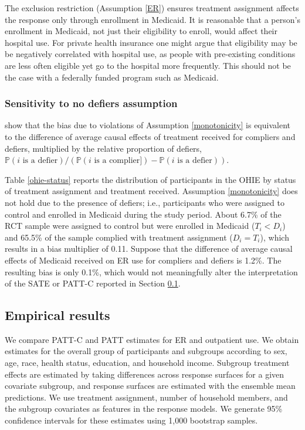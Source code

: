 \documentclass[hidelinks,12pt]{article}
\newcommand{\pr}{\mathbb{P}} %
\begin{document}
{The exclusion restriction (Assumption \ref{ER}) ensures treatment assignment affects the response only through enrollment in Medicaid. It is reasonable that a person's enrollment in Medicaid, not just their eligibility to enroll, would affect their hospital use. For private health insurance one might argue that eligibility may be be negatively correlated with hospital use, as people with pre-existing conditions are less often eligible yet go to the hospital more frequently. This should not be the case with a federally funded program such as Medicaid. 

{\color{red}
\subsubsection{Sensitivity to no defiers assumption} \label{sens-defiers}
}

\citet{Angrist1996} show that the bias due to violations of Assumption \ref{monotonicity} is equivalent to the difference of average causal effects of treatment received for compliers and defiers, multiplied by the relative proportion of defiers, 
$\pr(i\text{ is a defier}) / (\pr(i\text{ is a complier]}) - \pr(i\text{ is a defier})).$

Table \ref{ohie-status} reports the distribution of participants in the OHIE by status of treatment assignment and treatment received. Assumption \ref{monotonicity} does not hold due to the presence of defiers; i.e., participants who were assigned to control and enrolled in Medicaid during the study period. About 6.7\% of the RCT sample were assigned to control but were enrolled in Medicaid ($T_i < D_i$) and 65.5\% of the sample complied with treatment assignment ($D_i = T_i$), which results in a bias multiplier of 0.11. Suppose that the difference of average causal effects of Medicaid received on ER use for compliers and defiers is 1.2\%. The resulting bias is only 0.1\%, which would not meaningfully alter the interpretation of the SATE or PATT-C reported in Section \ref{results}. 
 
\subsection{Empirical results}\label{results}

We compare PATT-C and PATT estimates for ER and outpatient use. We obtain estimates for the overall group of participants and subgroups according to sex, age, race, health status, education, and household income. Subgroup treatment effects are estimated by taking differences across response surfaces for a given covariate subgroup, and response surfaces are estimated with {\color{red}the ensemble mean predictions}. We use treatment assignment, number of household members, and the subgroup covariates as features in the response models. We generate 95\% confidence intervals for these estimates using 1,000 bootstrap samples. %

}
\end{document}
